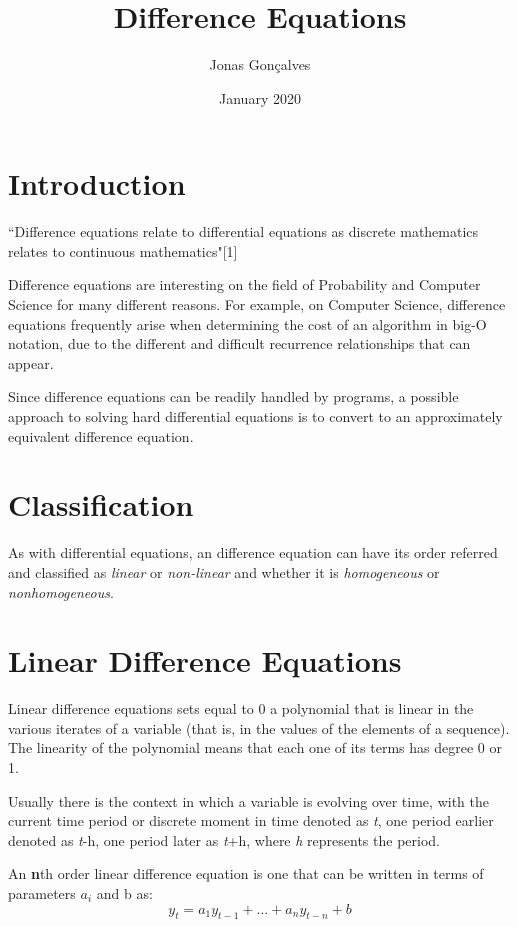 \documentclass{article}
\title{Difference Equations}
\author{Jonas Gonçalves}
\date{January 2020}
\begin{document}
\maketitle

\section{Introduction}

    ``Difference equations relate to differential equations as discrete mathematics relates to continuous mathematics"[1]
    
    Difference equations are interesting on the field of Probability and Computer Science for many different reasons. For example, on Computer Science, difference equations frequently arise when determining the cost of an algorithm in big-O notation, due to the different and difficult recurrence relationships that can appear.
    
    Since difference equations can be readily handled by programs, a possible approach to solving hard differential equations is to convert to an approximately equivalent difference equation.
    
\section{Classification}
    
    As with differential equations, an difference equation can have its order referred and classified as \textit{linear} or \textit{non-linear} and whether it is \textit{homogeneous} or \textit{nonhomogeneous}.
    
\section{Linear Difference Equations}

    Linear difference equations sets equal to 0 a polynomial that is linear in the various iterates of a variable (that is, in the values of the elements of a sequence). The linearity of the polynomial means that each one of its terms has degree 0 or 1.
    
    Usually there is the context in which a variable is evolving over time, with the current time period or discrete moment in time denoted as \textit{t}, one period earlier denoted as \textit{t}-h, one period later as \textit{t}+h, where \textit{h} represents the period.
    
    An \textbf{n}th order linear difference equation is one that can be written in terms of parameters \(a_i\) and b as:
    \[y_t = a_1 y_{t-1} + ... + a_n y_{t-n} + b\]
    
\end{document}

